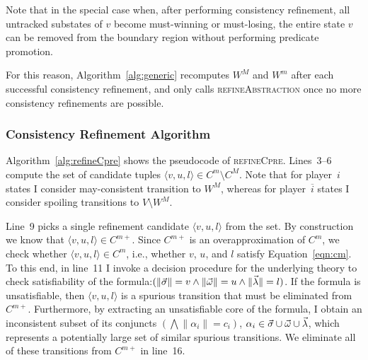 Note that in the special case when, after performing consistency refinement, all untracked substates of $v$ become must-winning or must-losing, the entire state $v$ can be removed from the boundary region without performing predicate promotion. 

For this reason, Algorithm~\ref{alg:generic} recomputes $W^M$ and $W^m$ after each successful consistency refinement, and only calls \textsc{refineAbstraction} once no more consistency refinements are possible.

\subsubsection{Consistency Refinement Algorithm}

Algorithm~\ref{alg:refineCpre} shows the pseudocode of \textsc{refineCpre}.  Lines~3--6 compute the set of candidate tuples $\langle v, u, l\rangle\in C^m\setminus C^M$.  Note that for player~$i$ states I consider may-consistent transition to $W^M$, whereas for player~$\overline{i}$ states I consider spoiling transitions to $V\setminus W^M$.

Line~9 picks a single refinement candidate $\langle v,u,l \rangle$ from the set.  By construction we know that $\langle v,u,l\rangle\in C^{m+}$.  Since $C^{m+}$ is an overapproximation of $C^m$, we check whether $\langle v,u,l\rangle\in C^m$, i.e., whether $v$, $u$, and $l$ satisfy Equation~\ref{eqn:cm}.  To this end, in line~11 I invoke a decision procedure for the underlying theory to check satisfiability of the formula:$(\|\vec{\sigma}\|=v \land \|\vec{\omega}\|=u \land \|\vec{\lambda}\|=l)$. If the formula is unsatisfiable, then $\langle v,u,l\rangle$ is a spurious transition that must be eliminated from $C^{m+}$.  Furthermore, by extracting an unsatisfiable core of the formula, I obtain an inconsistent subset of its conjuncts $(\bigwedge\|\alpha_i\|=c_i)$, $\alpha_i\in\vec{\sigma}\cup\vec{\omega}\cup\vec{\lambda}$, which represents a potentially large set of similar spurious transitions.  We eliminate all of these transitions from $C^{m+}$ in line~16.

